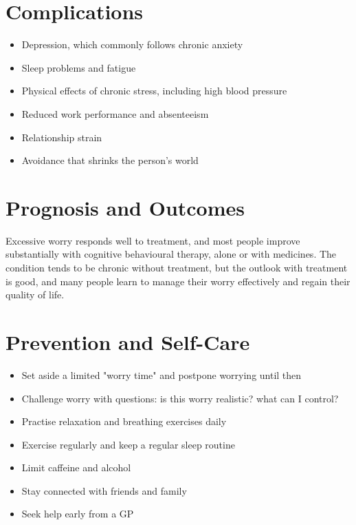 \section*{Complications}
\begin{itemize}
    \item Depression, which commonly follows chronic anxiety
    \item Sleep problems and fatigue
    \item Physical effects of chronic stress, including high blood pressure
    \item Reduced work performance and absenteeism
    \item Relationship strain
    \item Avoidance that shrinks the person's world
\end{itemize}

\section*{Prognosis and Outcomes}
Excessive worry responds well to treatment, and most people improve substantially with cognitive behavioural therapy, alone or with medicines. The condition tends to be chronic without treatment, but the outlook with treatment is good, and many people learn to manage their worry effectively and regain their quality of life.

\section*{Prevention and Self-Care}
\begin{itemize}
    \item Set aside a limited "worry time" and postpone worrying until then
    \item Challenge worry with questions: is this worry realistic? what can I control?
    \item Practise relaxation and breathing exercises daily
    \item Exercise regularly and keep a regular sleep routine
    \item Limit caffeine and alcohol
    \item Stay connected with friends and family
    \item Seek help early from a GP
\end{itemize}


